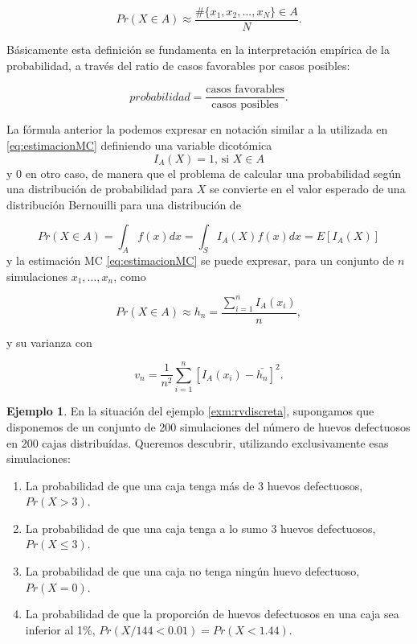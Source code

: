 \documentclass[
]{book}
\providecommand{\tightlist}{%
  \setlength{\itemsep}{0pt}\setlength{\parskip}{0pt}}
\theoremstyle{definition}
\theoremstyle{definition}
\newtheorem{example}{Ejemplo}[chapter]
\theoremstyle{definition}
\theoremstyle{definition}
\theoremstyle{remark}
\begin{document}
\begin{equation}
Pr(X \in A) \approx \frac{\#\{x_1, x_2,...,x_N\} \in A}{N}.
\end{equation}

Básicamente esta definición se fundamenta en la interpretación empírica de la probabilidad, a través del ratio de casos favorables por casos posibles:

\[probabilidad=\frac{\mbox{casos favorables}}{\mbox{casos posibles}}.\]

La fórmula anterior la podemos expresar en notación similar a la utilizada en \eqref{eq:estimacionMC} definiendo una variable dicotómica \[I_A(X)=1 \text{,  si } X \in A\] y 0 en otro caso, de manera que el problema de calcular una probabilidad según una distribución de probabilidad para \(X\) se convierte en el valor esperado de una distribución Bernouilli para una distribución de

\[Pr(X \in A)=\int_A f(x)dx=\int_S I_A(X)f(x)dx=E[I_A(X)]\] y la estimación MC \eqref{eq:estimacionMC} se puede expresar, para un conjunto de \(n\) simulaciones \(x_1,\ldots,x_n\), como

\begin{equation}
Pr(X \in A)\approx \hat{h_n}= \frac{\sum_{i=1}^n I_A(x_i)}{n},
\label{eq:estimacionMCprob}
\end{equation}

y su varianza con

\begin{equation}
v_n=\frac{1}{n^2} \sum_{i=1}^n [I_A(x_i)-\bar{h_n}]^2.
\label{eq:varMCprob}
\end{equation}

\begin{example}

En la situación del ejemplo \ref{exm:rvdiscreta}, supongamos que disponemos de un conjunto de 200 simulaciones del número de huevos defectuosos en 200 cajas distribuídas. Queremos descubrir, utilizando exclusivamente esas simulaciones:

\begin{enumerate}
\def\labelenumi{\arabic{enumi}.}
\tightlist
\item
  La probabilidad de que una caja tenga más de 3 huevos defectuosos, \(Pr(X>3)\).
\item
  La probabilidad de que una caja tenga a lo sumo 3 huevos defectuosos, \(Pr(X\leq 3)\).
\item
  La probabilidad de que una caja no tenga ningún huevo defectuoso, \(Pr(X=0)\).
\item
  La probabilidad de que la proporción de huevos defectuosos en una caja sea inferior al 1\%, \(Pr(X/144 < 0.01)=Pr(X<1.44)\).
\end{enumerate}

\end{example}
\end{document}
